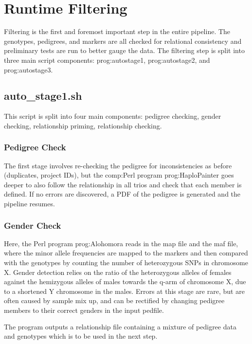 \section{Runtime Filtering}

Filtering is the first and foremost important step in the entire pipeline. The genotypes, pedigrees, and markers are all checked for relational consistency and preliminary tests are run to better gauge the data. The filtering step is split into three main script components: \gls{prog:autostage1}, \gls{prog:autostage2}, and \gls{prog:autostage3}.

\subsection{auto\_stage1.sh}

This script is split into four main components: pedigree checking, gender checking, relationship priming, relationship checking.

\subsubsection{Pedigree Check}

The first stage involves re-checking the pedigree for inconsistencies as before (duplicates, project IDs), but the \gls{comp:Perl} program \gls{prog:HaploPainter} goes deeper to also follow the relationship in all trios and check that each member is defined. If no errors are discovered, a PDF of the pedigree is generated and the pipeline resumes.

\subsubsection{Gender Check}

Here, the Perl program \gls{prog:Alohomora} reads in the map file and the maf file, where the minor allele frequencies are mapped to the markers and then compared with the genotypes by counting the number of heterozygous SNPs in chromosome X. Gender detection relies on the ratio of the heterozygous alleles of females against the hemizygous alleles of males towards the q-arm of chromosome X, due to a shortened Y chromosome in the males. Errors at this stage are rare, but are often caused by sample mix up, and can be rectified by changing pedigree members to their correct genders in the input pedfile.

The program outputs a relationship file containing a mixture of pedigree data and genotypes which is to be used in the next step.

